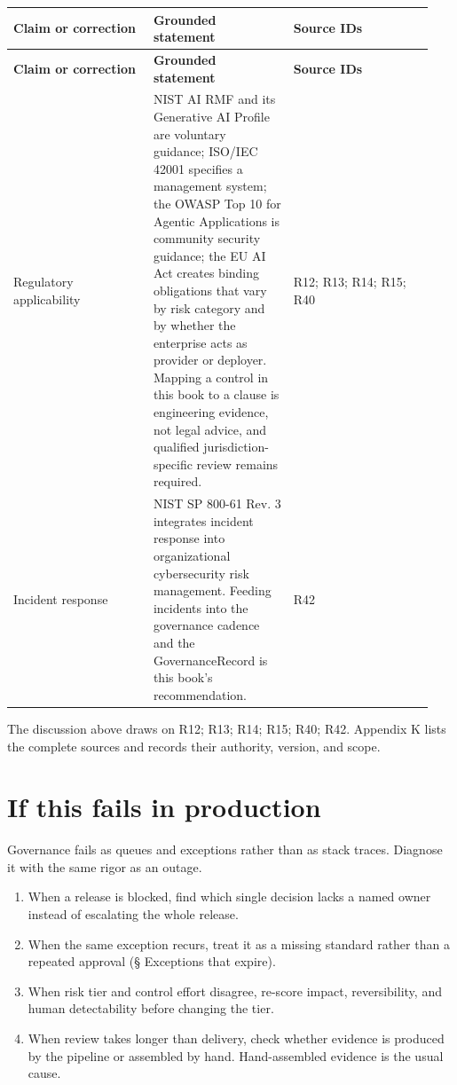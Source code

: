 \BookTableStart
\small
\begin{longtable}{@{}Y{0.3133\linewidth}Y{0.3133\linewidth}Y{0.3133\linewidth}@{}}
\color{white}\bfseries \textbf{Claim or correction} & \color{white}\bfseries \textbf{Grounded statement} & \color{white}\bfseries \textbf{Source IDs} \\
\endfirsthead
{}
\color{white}\bfseries \textbf{Claim or correction} & \color{white}\bfseries \textbf{Grounded statement} & \color{white}\bfseries \textbf{Source IDs} \\
\endhead
Regulatory applicability & NIST AI RMF and its Generative AI Profile are voluntary guidance; ISO/IEC 42001 specifies a management system; the OWASP Top 10 for Agentic Applications is community security guidance; the EU AI Act creates binding obligations that vary by risk category and by whether the enterprise acts as provider or deployer. Mapping a control in this book to a clause is engineering evidence, not legal advice, and qualified jurisdiction-specific review remains required. & R12; R13; R14; R15; R40 \\
Incident response & NIST SP 800-61 Rev. 3 integrates incident response into organizational cybersecurity risk management. Feeding incidents into the governance cadence and the GovernanceRecord is this book's recommendation. & R42 \\
\end{longtable}
\BookTableEnd

The discussion above draws on R12; R13; R14; R15; R40; R42. Appendix K lists the complete sources and records their authority, version, and scope.\par

\section{If this fails in production}

Governance fails as queues and exceptions rather than as stack traces. Diagnose it with the same rigor as an outage.\par

\begin{enumerate}

\item When a release is blocked, find which single decision lacks a named owner instead of escalating the whole release.

\item When the same exception recurs, treat it as a missing standard rather than a repeated approval (§ Exceptions that expire).

\item When risk tier and control effort disagree, re-score impact, reversibility, and human detectability before changing the tier.

\item When review takes longer than delivery, check whether evidence is produced by the pipeline or assembled by hand. Hand-assembled evidence is the usual cause.

\end{enumerate}

